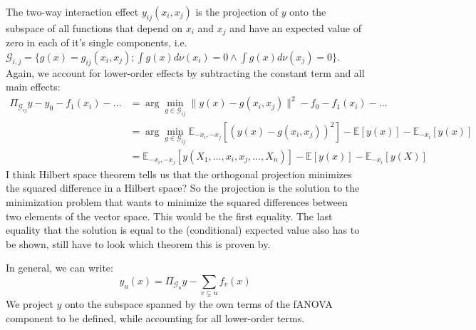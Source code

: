 The two-way interaction effect $y_{ij}(x_i,x_j)$ is the projection of $y$ onto the subspace of all functions that depend on $x_i$ and $x_j$ and have an expected value of zero in each of it's single components, i.e. $\mathcal{G}_{i,j} = \{g(x) = g_{ij}(x_i, x_j); \int g(x) d\nu (x_i) = 0 \land \int g(x) d\nu (x_j) = 0\}$. Again, we account for lower-order effects by subtracting the constant term and all main effects:
\begin{align*}
    \Pi_{\mathcal{G}_{ij}}y - y_0 - f_1(x_i) - \dots
    &= \arg \min_{g \in \mathcal{G}_{ij}} \|y(x) - g(x_i, x_j)\|^2 - f_0 - f_1(x_i) - \dots \\
    &= \arg \min_{g \in \mathcal{G}_{ij}} \mathbb{E}_{-x_i, -x_j}[(y(x) - g(x_i, x_j))^2] - \mathbb{E}[y(x)] - \mathbb{E}_{-x_i}[y(x)]\\
    &= \mathbb{E}_{-x_i, -x_j}[y(X_1, \dots, x_i, x_j, \dots, X_n)] - \mathbb{E}[y(x)] - \mathbb{E}_{-x_i}[y(X)]
\end{align*}
{\color{blue}I think Hilbert space theorem tells us that the orthogonal projection minimizes the squared difference in a Hilbert space?
So the projection is the solution to the minimization problem that wants to minimize the squared differences between two elements of the vector space.
This would be the first equality. The last equality that the solution is equal to the (conditional) expected value also has to be shown, still have to look which theorem this is proven by.}

In general, we can write:
\begin{equation}
    y_u(x) = \Pi_{\mathcal{G}_u}y - \sum_{v \subsetneq u} f_v(x)
\end{equation}
We project $y$ onto the subspace spanned by the own terms of the fANOVA component to be defined, while accounting for all lower-order terms.








